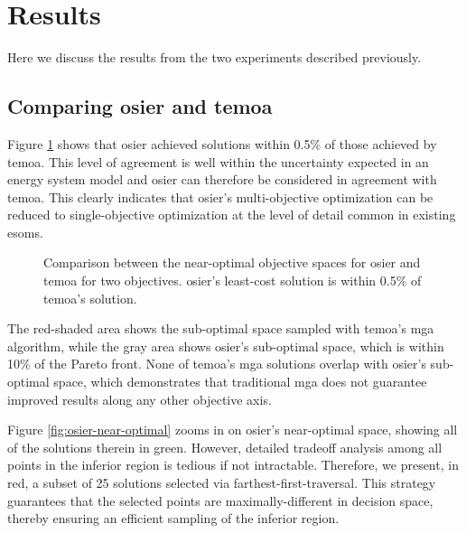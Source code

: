 \section{Results}

Here we discuss the results from the two experiments described previously.

\subsection{Comparing \gls{osier} and \gls{temoa}}

Figure \ref{fig:osier-temoa-benchmark} shows that \gls{osier} achieved solutions
within 0.5\%  of those achieved by \gls{temoa}. This level of agreement is well
within the uncertainty expected in an energy system model and \gls{osier} can
therefore be considered in agreement with \gls{temoa}. This clearly indicates
that \gls{osier}'s multi-objective optimization can be reduced to
single-objective optimization at the level of detail common in existing
\glspl{esom}.

\begin{figure}[ht!]
    \begin{center}
        \resizebox{\columnwidth}{!}{}
        \caption{Comparison between the near-optimal objective spaces for
        \gls{osier} and \gls{temoa} for two objectives. \gls{osier}'s least-cost
        solution is within 0.5\% of \gls{temoa}'s solution.}
        \label{fig:osier-temoa-benchmark}
    \end{center}
\end{figure}

The red-shaded area shows the sub-optimal space sampled with \gls{temoa}'s
\gls{mga} algorithm, while the gray area shows \gls{osier}'s sub-optimal space,
which is within 10\% of the Pareto front. None of \gls{temoa}'s \gls{mga}
solutions overlap with \gls{osier}'s sub-optimal space, which demonstrates that
traditional \gls{mga} does not guarantee improved results along any other
objective axis. 

Figure \ref{fig:osier-near-optimal} zooms in on \gls{osier}'s near-optimal
space, showing all of the solutions therein in green. However, detailed tradeoff
analysis among all points in the inferior region is tedious if not intractable.
Therefore, we present, in red, a subset of 25 solutions selected via
farthest-first-traversal. This strategy guarantees that the selected points are
maximally-different in decision space, thereby ensuring an efficient sampling of
the inferior region.

